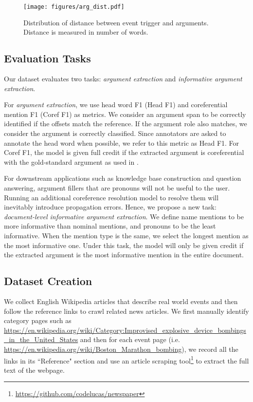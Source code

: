\begin{figure}
    \centering
    \texttt{[image: figures/arg\_dist.pdf]}
    \caption{Distribution of distance between event trigger and arguments. Distance is measured in number of words.}
     \vspace{-0.2cm}
    \label{fig:kairos_arg_dist}
\end{figure}

\subsection{Evaluation Tasks}
Our dataset evaluates two tasks: \textit{argument extraction} and \textit{informative argument extraction}. 

For \textit{argument extraction}, we use head word F1 (Head F1) and coreferential mention F1 (Coref F1) as metrics. 
We consider an argument span to be correctly identified if the offsets match the reference. If the argument role also matches, we consider the argument is correctly classified. Since annotators are asked to annotate the head word when possible,
we refer to this metric as Head F1.
For Coref F1, the model is given full credit if the extracted argument is coreferential with the gold-standard argument as used in \cite{Ji2008RefiningEE}.

For downstream applications such as knowledge base construction and question answering, argument fillers that are pronouns will not be useful to the user. Running an additional coreference resolution model to resolve them will inevitably introduce propagation errors. 
Hence, we propose a new task: \textit{document-level informative argument extraction}. We define name mentions to be more informative than nominal mentions, and pronouns to be the least informative. When the mention type is the same, we select the longest mention as the most informative one.
Under this task, the model will only be given credit if the extracted argument is the most informative mention in the entire document. %

\subsection{Dataset Creation}
We collect English Wikipedia articles that describe real world events and then follow the reference links to crawl related news articles.
We first manually identify category pages such as \url{https://en.wikipedia.org/wiki/Category:Improvised_explosive_device_bombings_in_the_United_States} and then for each event page (i.e. \url{https://en.wikipedia.org/wiki/Boston_Marathon_bombing}), we record all the links in its ``Reference" section and use an article scraping tool\footnote{\url{https://github.com/codelucas/newspaper}} to extract the full text of the webpage. 

